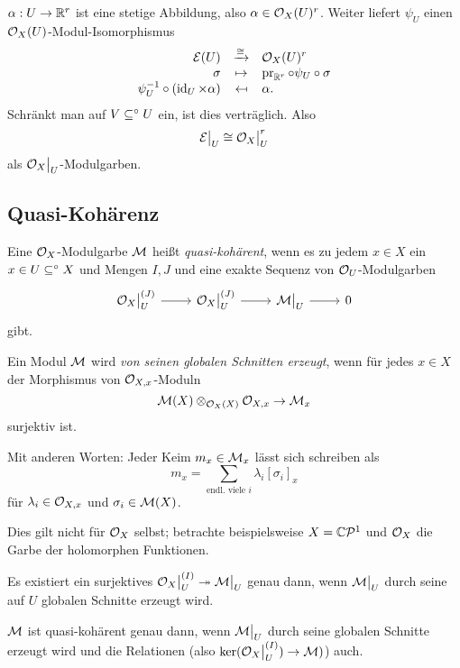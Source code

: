 $\alpha: U \to \mathbb{R}^r$ ist eine stetige Abbildung, also
$\alpha \in \mathcal{O}_X(U)^r$. Weiter liefert $\psi_U$ einen 
$\mathcal{O}_X(U)$-Modul-Isomorphismus
\[
    \funcdef{ \cal E(U) & \xto{\cong} & \O_X(U)^r \\ 
        \sigma & \mapsto & \pr_{\R^r} \circ \psi_U \circ \sigma \\
        \psi_U\inv \circ (\id_U \times \alpha)  & \mapsfrom & \alpha.}
\]
Schränkt man auf $V \subseteq^\circ U$ ein, ist dies verträglich. Also
\[ \mathcal E\big|_{U} \cong \mathcal{O}_X\big|_{U} ^r\]
als $\mathcal{O}_X\big|_{U}$-Modulgarben.

\subsection{Quasi-Kohärenz}

\begin{definition}
    Eine $\mathcal{O}_X$-Modulgarbe $\mathcal{M}$ heißt \emph{quasi-kohärent}, wenn es
    zu jedem $x\in X$ ein $x \in U \subseteq^\circ X$ und Mengen $I,J$ und
    eine exakte Sequenz von $\mathcal{O}_U$-Modulgarben
    \[\begin{tikzcd}
        \O_X\rest U^{(J)} \rar &\O_X\rest U^{(J)} \rar &
        \M\rest U \rar & 0
    \end{tikzcd}\]
    gibt.
\end{definition}

\begin{definition}
    Ein \OX Modul $\mathcal{M}$ wird \emph{von seinen globalen Schnitten erzeugt},
    wenn für jedes $x\in X$ der Morphismus von $\mathcal{O}_{X,x}$-Moduln
    \[ \mathcal{M}(X) \otimes_{\mathcal{O}_X(X)} \mathcal{O}_{X,x} \to \mathcal{M}_x\]
    surjektiv ist.
\end{definition}

Mit anderen Worten: Jeder Keim $m_x \in \mathcal{M}_x$ lässt sich schreiben als
\[ m_x = \sum_{\text{endl. viele }i} \lambda_i [\sigma_i]_x\]
für $\lambda_i \in \mathcal{O}_{X,x}$ und $\sigma_i \in \mathcal{M}(X)$.

Dies gilt nicht für $\mathcal{O}_X$ selbst; betrachte beispielsweise
$X = \mathbb{C}\mathcal P^1$ und $\mathcal{O}_X$ die Garbe der holomorphen Funktionen.

\begin{bemerkung}
    Es existiert ein surjektives 
    $\mathcal{O}_X\big|_{U}^{(I)} \twoheadrightarrow \mathcal{M}\big|_{U}$ genau dann, wenn
    $\mathcal{M}\big|_{U}$ durch seine auf $U$ globalen Schnitte erzeugt wird.
    
    $\mathcal{M}$ ist quasi-kohärent genau dann, wenn
    $\mathcal{M}\big|_{U}$ durch seine globalen Schnitte erzeugt wird und die Relationen
    (also $\ker(\mathcal{O}_X\big|_{U}^{(I)}) \to \mathcal{M})$) auch.  
\end{bemerkung}

